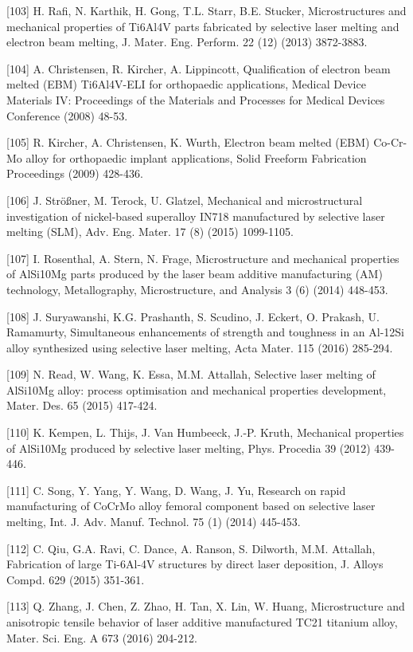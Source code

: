 \documentclass[10pt]{article}
\begin{document}
[103] H. Rafi, N. Karthik, H. Gong, T.L. Starr, B.E. Stucker, Microstructures and mechanical properties of Ti6Al4V parts fabricated by selective laser melting and electron beam melting, J. Mater. Eng. Perform. 22 (12) (2013) 3872-3883.

[104] A. Christensen, R. Kircher, A. Lippincott, Qualification of electron beam melted (EBM) Ti6Al4V-ELI for orthopaedic applications, Medical Device Materials IV: Proceedings of the Materials and Processes for Medical Devices Conference (2008) 48-53.

[105] R. Kircher, A. Christensen, K. Wurth, Electron beam melted (EBM) Co-Cr-Mo alloy for orthopaedic implant applications, Solid Freeform Fabrication Proceedings (2009) 428-436.

[106] J. Strößner, M. Terock, U. Glatzel, Mechanical and microstructural investigation of nickel-based superalloy IN718 manufactured by selective laser melting (SLM), Adv. Eng. Mater. 17 (8) (2015) 1099-1105.

[107] I. Rosenthal, A. Stern, N. Frage, Microstructure and mechanical properties of AlSi10Mg parts produced by the laser beam additive manufacturing (AM) technology, Metallography, Microstructure, and Analysis 3 (6) (2014) 448-453.

[108] J. Suryawanshi, K.G. Prashanth, S. Scudino, J. Eckert, O. Prakash, U. Ramamurty, Simultaneous enhancements of strength and toughness in an Al-12Si alloy synthesized using selective laser melting, Acta Mater. 115 (2016) 285-294.

[109] N. Read, W. Wang, K. Essa, M.M. Attallah, Selective laser melting of AlSi10Mg alloy: process optimisation and mechanical properties development, Mater. Des. 65 (2015) 417-424.

[110] K. Kempen, L. Thijs, J. Van Humbeeck, J.-P. Kruth, Mechanical properties of AlSi10Mg produced by selective laser melting, Phys. Procedia 39 (2012) 439-446.

[111] C. Song, Y. Yang, Y. Wang, D. Wang, J. Yu, Research on rapid manufacturing of CoCrMo alloy femoral component based on selective laser melting, Int. J. Adv. Manuf. Technol. 75 (1) (2014) 445-453.

[112] C. Qiu, G.A. Ravi, C. Dance, A. Ranson, S. Dilworth, M.M. Attallah, Fabrication of large Ti-6Al-4V structures by direct laser deposition, J. Alloys Compd. 629 (2015) 351-361.

[113] Q. Zhang, J. Chen, Z. Zhao, H. Tan, X. Lin, W. Huang, Microstructure and anisotropic tensile behavior of laser additive manufactured TC21 titanium alloy, Mater. Sci. Eng. A 673 (2016) 204-212.
\end{document}

